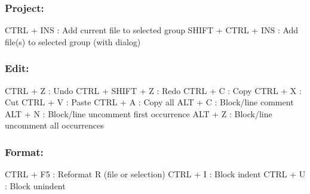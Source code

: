 \subsubsection{Project:}

\vspace{-0.5cm}
\begin{Rtables}[caption={[Project menu keyboard shortcuts]
    Project keyboard shortcuts},
  label=menu:project]
  CTRL  + INS             : Add current file to selected group
  SHIFT + CTRL + INS      : Add file(s) to selected group (with dialog)
\end{Rtables}


\subsubsection{Edit:}

\vspace{-0.5cm}
\begin{Rtables}[caption={[Edit menu keyboard shortcuts]
    Edit menu keyboard shortcuts},
  label=menu:edit]
  CTRL + Z                : Undo
  CTRL + SHIFT + Z        : Redo
  CTRL + C                : Copy
  CTRL + X                : Cut
  CTRL + V                : Paste
  CTRL + A                : Copy all
  ALT  + C                : Block/line comment
  ALT  + N                : Block/line uncomment first occurrence
  ALT  + Z                : Block/line uncomment all occurrences
\end{Rtables}


\newpage
\subsubsection{Format:}

\vspace{-0.5cm}
\begin{Rtables}[caption={[Format menu keyboard shortcuts]
    Format menu keyboard shortcuts},
  label=menu:format]
  CTRL + F5               : Reformat R (file or selection)
  CTRL + I                : Block indent
  CTRL + U                : Block unindent
\end{Rtables}


